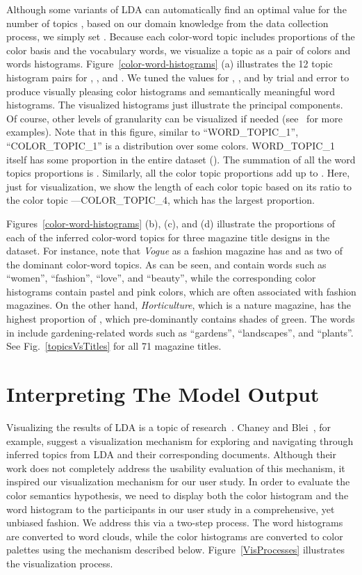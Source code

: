 \documentclass[prodmode,acmtochi]{acmsmall}
\begin{document}
Although some variants of LDA can automatically find an optimal value for the number of topics ,
based on our domain knowledge from the data collection process, we
simply set . Because each color-word topic includes proportions of
the color basis and the vocabulary words, we visualize a topic as a pair of
colors and words histograms.  Figure~\ref{color-word-histograms} (a)
illustrates the 12 topic histogram pairs for , , and
.
We tuned the values for , , and  by trial and error to produce visually pleasing color
histograms and semantically meaningful word histograms.
The visualized histograms just illustrate the principal components.  Of course, other levels of granularity can be visualized if needed (see~\cite{jahanian2014quantifyingaesthetics} for more examples).
Note that in this figure, similar to ``WORD\_TOPIC\_1'', ``COLOR\_TOPIC\_1'' is a distribution over some colors. WORD\_TOPIC\_1 itself has some proportion in the entire dataset (). The summation of all the  word topics proportions is . Similarly, all the  color topic proportions add up to . Here, just for visualization, we show the length of each color topic based on its ratio to the color topic ---COLOR\_TOPIC\_4, which has the largest proportion.

Figures~\ref{color-word-histograms} (b), (c), and (d) illustrate the
proportions of each of the inferred color-word topics for three magazine
title designs in the dataset.  For instance, note that \emph{Vogue} as a
fashion magazine has  and  as two of the dominant color-word
topics. As can be seen,  and  contain words such as
``women'', ``fashion'', ``love'', and ``beauty'', while the
corresponding color histograms contain pastel and pink colors, which are
often associated with fashion magazines. On the other hand,
\emph{Horticulture}, which is a nature magazine, has the highest
proportion of , which pre-dominantly contains shades of green. The
words in  include gardening-related words such as ``gardens'',
``landscapes'', and ``plants''. See Fig.~\ref{topicsVsTitles} for all 71 magazine titles.

\section{Interpreting The Model Output}
\label{sec:InterpretingModelOutput}

Visualizing the results of LDA is a topic of research~\cite{chaney2012visualizing,chuang2012termite}.  Chaney and
Blei~\cite{chaney2012visualizing}, for example, suggest a visualization
mechanism for exploring and navigating through inferred topics from LDA
and their corresponding documents.  Although their work does not completely address the usability evaluation of
this mechanism, it inspired
our visualization mechanism for our user study.  In order to evaluate
the color semantics hypothesis, we need to display both the color
histogram and the word histogram to the participants in our user study
in a comprehensive, yet unbiased fashion.  We address this via a two-step
process. The word histograms are converted to word clouds, while the
color histograms are converted to color palettes using the mechanism
described below. Figure~\ref{VisProcesses} illustrates the
visualization process.
\end{document}

